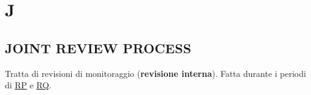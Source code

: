 \newpage
	\section{J} \label{sec:J}

		\subsection{JOINT REVIEW PROCESS}  \label{joint}
		Tratta di revisioni di monitoraggio (\textbf{revisione interna}). Fatta durante i periodi di \underline{\hyperref[RP]{RP}} e \underline{\hyperref[RQ]{RQ}}.
